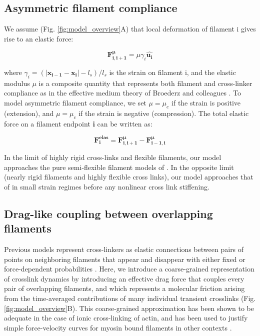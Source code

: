 \subsection{Asymmetric filament compliance}
We assume (Fig. \ref{fig:model_overview}A) that local deformation of filament  i gives rise to an elastic force:

\begin{equation}
\label{eqn:spring}
\mathbf{F^{\mu}_{i,i+1}} = \mu \gamma_{i}  \mathbf{\hat{u_i}}
\end{equation}


where $ \gamma_{i} = (|\mathbf{x_{i-1}}-\mathbf{x_i}|-l_s)/l_s$ is the strain on filament i, and the elastic modulus  $\mu$ is a composite quantity that represents both filament and cross-linker compliance as in the effective medium theory of Broederz and colleagues \cite{theo_crosslinknonlinear}.  To model asymmetric filament compliance, we set $\mu = \mu_e$ if the strain is positive (extension), and $\mu = \mu_c$ if the strain is negative (compression). The total elastic force on a filament endpoint $\mathbf{i}$ can be written as:

\begin{equation}
\label{eqn:internal}
\mathbf{F^{elas}_i} =  \mathbf{F^{\mu}_{i,i+1}} - \mathbf{F^{\mu}_{i-1,i}} 
\end{equation}

In the limit of highly rigid cross-links and flexible filaments, our model approaches the pure semi-flexible filament models of \cite{theo_hlm,theo_hlm2}. In the opposite limit (nearly rigid filaments and highly flexible cross links), our model approaches that of \cite{theo_crosslinknonlinear} in small strain regimes before any nonlinear cross link stiffening. 

\subsection{Drag-like coupling between overlapping filaments}
\label{exp_drag}
Previous models represent cross-linkers as elastic connections between pairs of points on neighboring filaments that appear and disappear with either fixed or force-dependent probabilities \cite{model_taeyoon,theo_crosslinknonlinear}.  Here, we introduce a coarse-grained representation of crosslink dynamics by introducing an effective drag force that couples every pair of overlapping filaments, and which represents a molecular friction arising from the time-averaged contributions of many individual transient crosslinks (Fig. \ref{fig:model_overview}B). This coarse-grained approximation has been shown to be adequate in the case of ionic cross-linking of actin\cite{mol_fric,theo_hydroish2}, and has been used to justify simple force-velocity curves for myosin bound filaments in other contexts \cite{theo_frictionShila}. 

